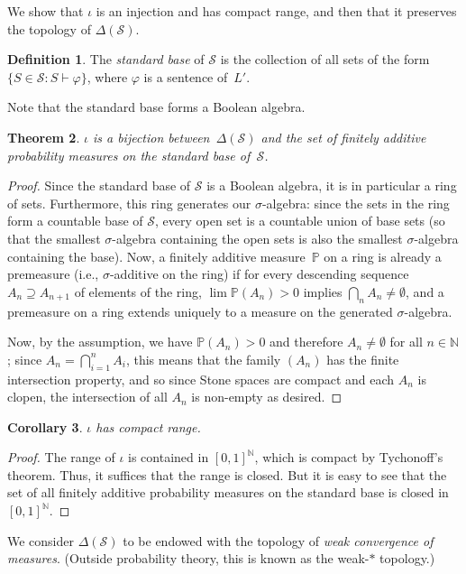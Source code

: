 \documentclass[12pt]{article}
\newcommand{\PP}{\mathbb{P}}
\newcommand{\vp}{\varphi}
\newcommand{\NN}{\mathbb{N}}
\newcommand{\cL}{L'}
\newcommand{\cS}{\mathcal{S}}
\theoremstyle{plain}
\newtheorem{theorem}{Theorem}[subsection]
\newtheorem{corollary}[theorem]{Corollary}
\theoremstyle{definition}
\newtheorem{definition}[theorem]{Definition}
\theoremstyle{remark}
\begin{document}
We show that $\iota$ is an injection and has compact range, and then that it preserves the topology of $\Delta(\cS)$.
\begin{definition}
The \emph{standard base} of $\cS$ is the collection of all sets of the form $\{S\in\cS : S\vdash\vp\}$, where $\vp$ is a sentence of~$\cL$.
\end{definition}
Note that the standard base forms a Boolean algebra.
\begin{theorem}
$\iota$ is a bijection between~$\Delta(\cS)$ and the set of finitely additive probability measures on the standard base of~$\cS$.
\end{theorem}
\begin{proof}
Since the standard base of $\cS$ is a Boolean algebra, it is in particular a ring of sets. Furthermore, this ring generates our $\sigma$-algebra: since the sets in the ring form a countable base of $\cS$, every open set is a countable union of base sets (so that the smallest $\sigma$-algebra containing the open sets is also the smallest $\sigma$-algebra containing the base).
Now, a finitely additive measure~$\PP$ on a ring is already a premeasure (i.e., $\sigma$-additive on the ring) if for every descending sequence $A_n\supseteq A_{n+1}$ of elements of the ring, $\lim \PP(A_n) > 0$ implies $\textstyle\bigcap_n A_n \neq\emptyset$, and a premeasure on a ring extends uniquely to a measure on the generated $\sigma$-algebra. 

Now, by the assumption, we have $\PP(A_n) > 0$ and therefore $A_n\neq\emptyset$ for all $n\in\mathbb{N}$; since $\textstyle A_n = \bigcap_{i=1}^n A_i$, this means that the family $(A_n)$ has the finite intersection property, and so since Stone spaces are compact and each $A_n$ is clopen, the intersection of all $A_n$ is non-empty as desired.
\end{proof}
\begin{corollary}
$\iota$ has compact range.
\end{corollary}
\begin{proof}
The range of $\iota$ is contained in $[0,1]^\NN$, which is compact by Tychonoff's theorem. Thus, it suffices that the range is closed. But it is easy to see that the set of all finitely additive probability measures on the standard base is closed in $[0,1]^\NN$.
\end{proof}
We consider $\Delta(\cS)$ to be endowed with the topology of \emph{weak convergence of measures}. (Outside probability theory, this is known as the weak-$*$ topology.)
\end{document}
